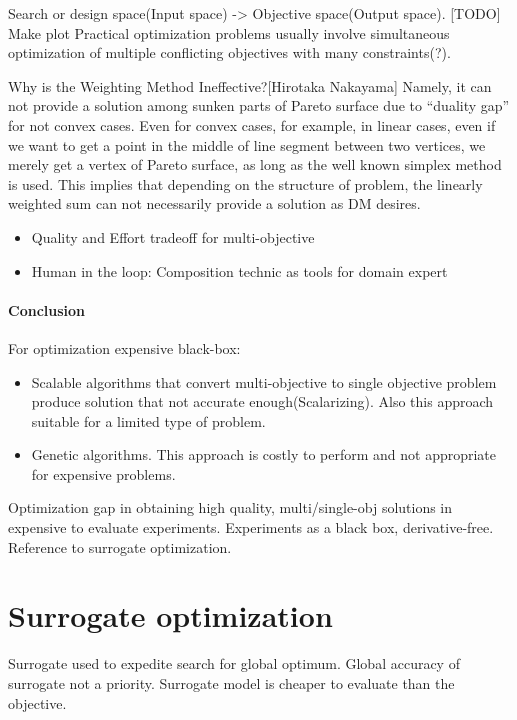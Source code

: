        Search or design space(Input space) -> Objective space(Output space).
        [TODO] Make plot 
        Practical optimization problems usually involve simultaneous optimization of multiple conflicting objectives with many constraints(?).


        Why is the Weighting Method Ineffective?[Hirotaka Nakayama]
        Namely, it can not provide a solution among sunken parts of Pareto surface due to “duality gap” for not convex cases. 
        Even for convex cases, for example, in linear cases, even if we want to get a point in the middle of line segment between two vertices, we merely get a vertex of Pareto surface, as
        long as the well known simplex method is used. This implies that depending on the structure of problem, the linearly weighted sum can not necessarily provide a solution as DM desires.


        \begin{itemize}
            \item Quality and Effort tradeoff for multi-objective
            \item Human in the loop: Composition technic as tools for domain expert
        \end{itemize}

        \paragraph{Conclusion}
        For optimization expensive black-box:
        \begin{itemize}
            \item Scalable algorithms that convert multi-objective to single objective problem produce solution that not accurate enough(Scalarizing). Also this approach suitable for a limited type of problem.
            \item Genetic algorithms. This approach is costly to perform and not appropriate for expensive problems.
        \end{itemize}
        Optimization gap in obtaining high quality, multi/single-obj solutions in expensive to evaluate experiments.
        Experiments as a black box, derivative-free. Reference to surrogate optimization.

    \section{Surrogate optimization}
        Surrogate used to expedite search for global optimum. Global accuracy of surrogate
        not a priority. Surrogate model is cheaper to evaluate than the objective.

